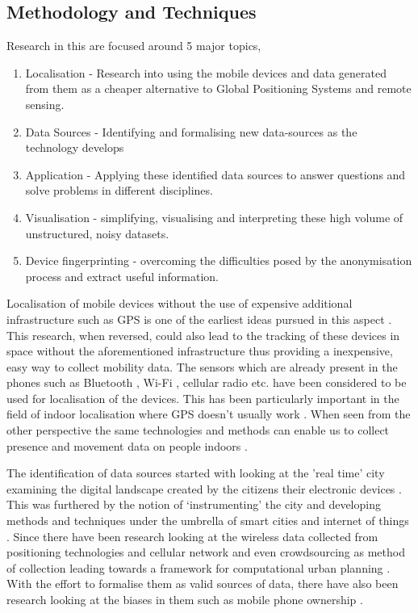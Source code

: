 \subsection{Methodology and Techniques}

Research in this are focused around 5 major topics,

\begin{enumerate}[rightmargin=2em, leftmargin=2em]
  \itemsep-0.25em
  \item Localisation - Research into using the mobile devices and data generated from them as a cheaper alternative to Global Positioning Systems and remote sensing.
  \item Data Sources - Identifying and formalising new data-sources as the technology develops
  \item Application - Applying these identified data sources to answer questions and solve problems in different disciplines.
  \item Visualisation - simplifying, visualising and interpreting these high volume of unstructured, noisy datasets.
  \item Device fingerprinting - overcoming the difficulties posed by the anonymisation process and extract useful information.
\end{enumerate}

Localisation of mobile devices without the use of expensive additional infrastructure such as GPS is one of the earliest ideas pursued in this aspect \citep{bulusu2000, he2003, moore2004, lamarca2005}.
This research, when reversed, could also lead to the tracking of these devices in space without the aforementioned infrastructure thus providing a inexpensive, easy way to collect mobility data.
The sensors which are already present in the phones such as Bluetooth \citep{bandara2004}, Wi-Fi \citep{zarim2006}, cellular radio \citep{dil2011, ahas2005} etc. have been considered to be used for localisation of the devices.
This has been particularly important in the field of indoor localisation where GPS doesn't usually work \cite[-2cm]{kawaguchi2009}.
When seen from the other perspective the same technologies and methods can enable us to collect presence and movement data on people indoors \citep{roy2018a, roy2018b, jia2019, nikitin2019, kulshrestha2019, deng2018}.

The identification of data sources started with looking at the 'real time' city examining the digital landscape created by the citizens their electronic devices \citep{townsend2000}.
This was furthered by the notion of `instrumenting' the city and developing methods and techniques under the umbrella of smart cities and internet of things \citep{oneill2006, sruthi2019}.
Since there have been research looking at the wireless data collected from positioning technologies \citep{bensky2007} and cellular network \citep{kiukkonen2010, steenbruggen2015} and even crowdsourcing as method of collection \citep{shin2013} leading towards a framework for computational urban planning \citep{kontokosta2015}.
With the effort to formalise them as valid sources of data, there have also been research looking at the biases in them such as mobile phone ownership \citep{wesolowski2013, kobus2013}.

